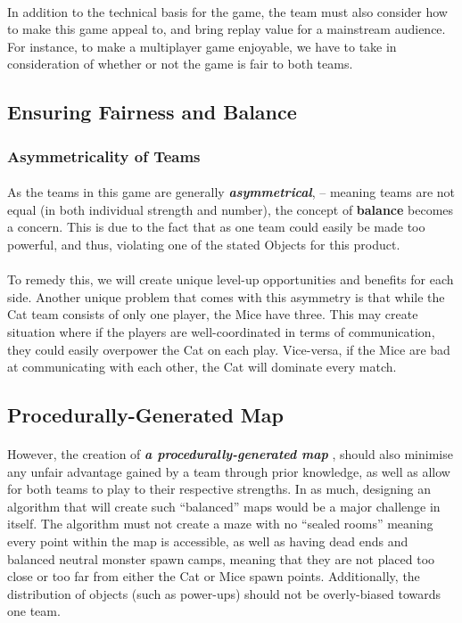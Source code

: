 \documentclass{article}
\begin{document}
\paragraph{}In addition to the technical basis for the game, the team must also consider how to make this game appeal to, and bring replay value for a mainstream audience. For instance, to make a multiplayer game enjoyable, we have to take in consideration of whether or not the game is fair to both teams. 

\subsection{Ensuring Fairness and Balance}

\subsubsection{Asymmetricality of Teams}
\paragraph{}As the teams in this game are generally \textbf{\emph{asymmetrical}}, -- meaning teams are not equal (in both individual strength and number),  the concept of \textbf{balance} becomes a concern. This is due to the fact that as one team could easily be made too powerful, and thus, violating one of the stated Objects for this product. 
 
 \paragraph{}To remedy this, we will create unique level-up opportunities and benefits for each side. Another unique problem that comes with this asymmetry is that while the Cat team consists of only one player, the Mice have three. This may create situation where if the players are well-coordinated in terms of communication, they could easily overpower
the Cat on each play. Vice-versa, if the Mice are bad at communicating with each other, the Cat will
dominate every match.

\subsection{Procedurally-Generated Map}

\paragraph{}However, the creation of \textbf{\emph{a procedurally-generated map}} , should also minimise any unfair advantage gained by a team through prior knowledge, as well as allow for both teams to play to their respective strengths. In as much, designing an algorithm that will create such “balanced” maps would be a major challenge in itself. The algorithm must not create a maze with no “sealed rooms” meaning every point within the map is accessible, as well as having dead ends and balanced neutral monster spawn camps, meaning that they are not placed too close or too far from either the Cat or Mice spawn points. Additionally, the distribution of objects (such as power-ups) should not be overly-biased towards one team.
\end{document}
